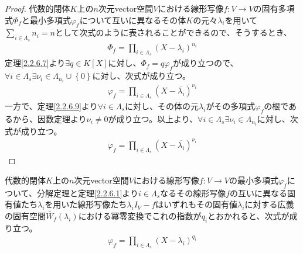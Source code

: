 \documentclass[dvipdfmx]{jsarticle}
\begin{document}
\begin{proof}
代数的閉体$K$上の$n$次元vector空間$V$における線形写像$f:V \rightarrow V$の固有多項式$\varPhi_{f}$と最小多項式$\varphi_{f}$について互いに異なるその体$K$の元々$\lambda_{i}$を用いて$\sum_{i \in \varLambda_{s}} n_{i} = n$として次式のように表されることができるので、そうするとき、
\begin{align*}
\varPhi_{f} = \prod_{i \in \varLambda_{s}} \left( X - \lambda_{i} \right)^{n_{i}}
\end{align*}
定理\ref{2.2.6.7}より$\exists q \in K[ X]$に対し、$\varPhi_{f} = q\varphi_{f}$が成り立つので、$\forall i \in \varLambda_{s}\exists\nu_{i} \in \varLambda_{n_{i}} \cup \left\{ 0 \right\}$に対し、次式が成り立つ。
\begin{align*}
\varphi_{f} = \prod_{i \in \varLambda_{s}} \left( X - \overline{\lambda_{i}} \right)^{\nu_{i}}
\end{align*}
一方で、定理\ref{2.2.6.9}より$\forall i \in \varLambda_{s}$に対し、その体の元$\lambda_{i}$がその多項式$\varphi_{f}$の根であるから、因数定理より$\nu_{i} \neq 0$が成り立つ。以上より、$\forall i \in \varLambda_{s}\exists\nu_{i} \in \varLambda_{n_{i}}$に対し、次式が成り立つ。
\begin{align*}
\varphi_{f} = \prod_{i \in \varLambda_{s}} \left( X - \overline{\lambda_{i}} \right)^{\nu_{i}}
\end{align*}
\end{proof}
\begin{thm}\label{2.2.6.11}
代数的閉体$K$上の$n$次元vector空間$V$における線形写像$f:V \rightarrow V$の最小多項式$\varphi_{f}$について、分解定理と定理\ref{2.2.6.1}より$i \in \varLambda_{s}$なるその線形写像$f$の互いに異なる固有値たち$\lambda_{i}$を用いた線形写像たち$\lambda_{i}I_{V} - f$はいずれもその固有値$\lambda_{i}$に対する広義の固有空間$\widetilde{W_{f}}\left( \lambda_{i} \right)$における冪零変換でこれの指数が$q_{i}$とおかれると、次式が成り立つ。
\begin{align*}
\varphi_{f} = \prod_{i \in \varLambda_{s}} \left( X - \lambda_{i} \right)^{q_{i}}
\end{align*}
\end{thm}
\end{document}

